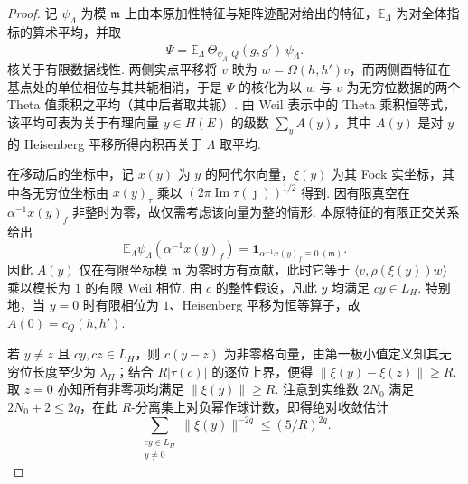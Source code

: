 \begin{proof}
记 $\psi_\Lambda$ 为模 $\mathfrak m$ 上由本原加性特征与矩阵迹配对给出的特征，$\mathbb E_\Lambda$ 为对全体指标的算术平均，并取
\[
 \Psi=\mathbb E_\Lambda\,
          \overline{\Theta_{\psi_\Lambda,Q}(g,g')}\,\psi_\Lambda .
\]
核关于有限数据线性. 两侧实点平移将 $v$ 映为 $w=\Omega(h,h')v$，而两侧酉特征在基点处的单位相位与其共轭相消，于是 $\Psi$ 的核化为以 $w$ 与 $v$ 为无穷位数据的两个 Theta 值乘积之平均（其中后者取共轭）. 由 Weil 表示中的 Theta 乘积恒等式，该平均可表为关于有理向量 $y\in H(E)$ 的级数 $\sum_y A(y)$，其中 $A(y)$ 是对 $y$ 的 Heisenberg 平移所得内积再关于 $\Lambda$ 取平均.

在移动后的坐标中，记 $x(y)$ 为 $y$ 的阿代尔向量，$\xi(y)$ 为其 Fock 实坐标，其中各无穷位坐标由 $x(y)_\tau$ 乘以 $(2\pi\operatorname{Im}\tau(\jmath{}))^{1/2}$ 得到. 因有限真空在 $\alpha^{-1}x(y)_f$ 非整时为零，故仅需考虑该向量为整的情形. 本原特征的有限正交关系给出
\[
 \mathbb E_\Lambda\psi_\Lambda(\alpha^{-1}x(y)_f)=
 \mathbf 1_{\alpha^{-1}x(y)_f\equiv0\ (\mathfrak m)} .
\]
因此 $A(y)$ 仅在有限坐标模 $\mathfrak m$ 为零时方有贡献，此时它等于 $\langle v,\rho(\xi(y))w\rangle$ 乘以模长为 $1$ 的有限 Weil 相位. 由 $c$ 的整性假设，凡此 $y$ 均满足 $cy\in L_H$. 特别地，当 $y=0$ 时有限相位为 $1$、Heisenberg 平移为恒等算子，故 $A(0)=c_Q(h,h')$.

若 $y\ne z$ 且 $cy,cz\in L_H$，则 $c(y-z)$ 为非零格向量，由第一极小值定义知其无穷位长度至少为 $\lambda_H$；结合 $R|\tau(c)|$ 的逐位上界，便得 $\|\xi(y)-\xi(z)\|\ge R$. 取 $z=0$ 亦知所有非零项均满足 $\|\xi(y)\|\ge R$. 注意到实维数 $2N_0$ 满足 $2N_0+2\le 2q$，在此 $R$-分离集上对负幂作球计数，即得绝对收敛估计
\[
 \sum_{\substack{cy\in L_H\\y\ne0}}
       \|\xi(y)\|^{-2q}\le (5/R)^{2q}.
\]


\end{proof}
